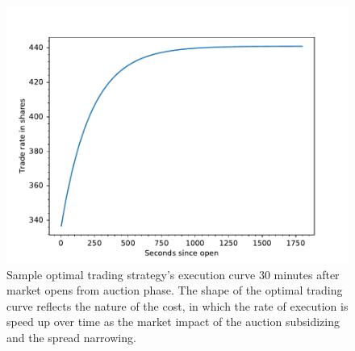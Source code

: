 \begin{figure}[h]
  \includegraphics[width=\textwidth]{images/SampleTradeCurve}
  \caption{Sample optimal trading strategy's execution curve 30 minutes after market opens from auction phase. The shape of the optimal trading curve reflects the nature of the cost, in which the rate of execution is speed up over time as the market impact of the auction subsidizing and the spread narrowing.}
  \label{fig:optimal_curve_strategy}
\end{figure}

